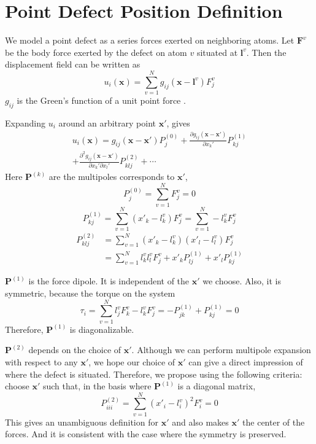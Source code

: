 \documentclass[%
 reprint,
 nofootinbib,
 amsmath,amssymb,
 aps,
]{revtex4-1}
\begin{document}
\appendix
\section{Point Defect Position Definition}
\label{app:position}
We model a point defect as a series forces exerted on neighboring atoms.
Let $\bm{F}^{v}$ be the body force exerted by the defect on atom $v$ situated at $\bm{l}^v$.
Then the displacement field can be written as
\begin{equation}
u_i(\bm{x}) = \sum_{v=1}^{N} g_{ij}(\bm{x}-\bm{l}^v) F_j^v
\end{equation}
$g_{ij}$ is the Green's function of a unit point force \cite{seifmultipolar,ting1997three}.

Expanding $u_i$ around an arbitrary point $\bm{x'}$, gives
\begin{multline}
u_i(\bm{x})
= g_{ij}(\bm{x}-\bm{x'}) P_j^{(0)}
 + \frac{\partial g_{ij}(\bm{x}-\bm{x'})}{\partial x_k'} P_{kj}^{(1)}\\
 + \frac{\partial^2 g_{ij}(\bm{x}-\bm{x'})}{\partial x_k' \partial x_l'} P_{klj}^{(2)}
 + \cdots
\end{multline}
Here $\bm{P}^{(k)}$ are the multipoles corresponds to $\bm{x'}$,
\begin{equation}
  P_j^{(0)} = \sum_{v=1}^N F_j^v = 0
\end{equation}
\begin{equation}
  P_{kj}^{(1)} = \sum_{v=1}^N (x'_k-l_k^v) F_j^v = \sum_{v=1}^N -l_k^v F_j^v
\end{equation}
\begin{align}
  P_{klj}^{(2)} & = \sum_{v=1}^N (x'_k-l_k^v) (x'_l-l_l^v) F_j^v \nonumber \\
  & = \sum_{v=1}^N l_k^vl_l^v F_j^v + x'_k P_{lj}^{(1)} + x'_l P_{kj}^{(1)}
\end{align}

$\bm{P}^{(1)}$ is the force dipole.
It is independent of the $\bm{x'}$ we choose.
Also, it is symmetric, because the torque on the system
\begin{equation}
  \tau_i = \sum_{v=1}^N l_j^v F_k^v - l_k^v F_j^v = -P_{jk}^{(1)} + P_{kj}^{(1)} = 0
\end{equation}
Therefore, $\bm{P}^{(1)}$ is diagonalizable.

$\bm{P}^{(2)}$ depends on the choice of $\bm{x'}$.
Although we can perform multipole expansion with respect to any $\bm{x'}$, we hope our choice of $\bm{x'}$ can give a direct impression of where the defect is situated.
Therefore, we propose using the following criteria:
choose $\bm{x'}$ such that, in the basis where $\bm{P}^{(1)}$ is a diagonal matrix,
\begin{equation}
  P_{iii}^{(2)} = \sum_{v=1}^N (x'_i-l_i^v)^2 F_i^v = 0
\end{equation}
This gives an unambiguous definition for $\bm{x'}$ and also makes $\bm{x'}$ the center of the forces.
And it is consistent with the case where the symmetry is preserved.
\end{document}
